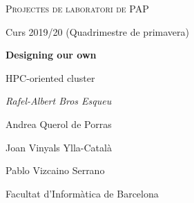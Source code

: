 \makeatletter
\begin{titlepage}
\thispagestyle{empty}
\begin{center}
	\centering
	\vspace{1cm}
	{\scshape\Large Projectes de laboratori de PAP\par}
	\vspace{0.5cm}
	{\Large Curs 2019/20 (Quadrimestre de primavera)\par}
	\vspace{3cm}
	{\huge\bfseries Designing our own\par HPC-oriented cluster\par}
	\vspace{6cm}
  {
  {\Large \itshape Rafel-Albert Bros Esqueu\par Andrea Querol de Porras\par Joan Vinyals Ylla-Català\par Pablo Vizcaino Serrano\par}
  }
  \vspace{0.5cm}
  \vfill
	{\large Facultat d'Informàtica de Barcelona\par}
\end{center}
\clearpage
\end{titlepage}
